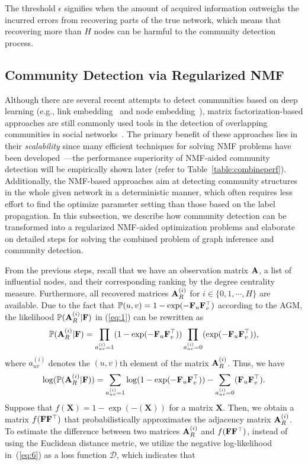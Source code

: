 \documentclass[format=acmsmall, review=false, screen=true]{acmart}
\def \log{\operatorname{log}}
\def \exp{\operatorname{exp}}
\begin{document}
The threshold $\epsilon$ signifies when the amount of acquired information outweighs the incurred errors from recovering parts of the true network, which means that recovering more than $H$ nodes can be harmful to the community detection process.

\subsection{Community Detection via Regularized NMF}\label{sec:3d}

Although there are several recent attempts to detect communities based on deep learning (e.g., link embedding~\cite{linkblack} and node embedding~\cite{vgraph}), matrix factorization-based approaches are still commonly used tools in the detection of overlapping communities in social networks~\cite{bigclam,BNMF,newnmf}. The primary benefit of these approaches lies in their {\em scalability} since many efficient techniques for solving NMF problems have been developed~\cite{nmfsolve}---the performance superiority of NMF-aided community detection will be empirically shown  later (refer to Table~\ref{table:combineperf}). Additionally, the NMF-based approaches aim at detecting community structures in the whole given network in a deterministic manner, which often requires less effort to find the optimize parameter setting than those based on the label propagation. In this subsection, we describe how community detection can be transformed into a regularized NMF-aided optimization problems and elaborate on detailed steps for solving the combined problem of graph inference and community detection.

From the previous steps, recall that we have an observation matrix ${\bf A}$, a list of influential nodes, and their corresponding ranking by the degree centrality measure. Furthermore, all recovered matrices ${\bf A}^{(i)}_R$ for $i \in \{0,1,\cdots,H\}$ are available. Due to the fact that $\mathbb{P}(u,v) = 1 - \exp(-{\bf F}_{u} {\bf F}^{\top}_{v})$ according to the AGM, the likelihood $\mathbb{P}({\bf A}_R^{(i)}|{\bf F})$ in (\ref{eq:1}) can be rewritten as
\begin{equation}\label{eq:5}
\mathbb{P}({\bf A}_R^{(i)}|{\bf F}) = \prod_{a_{uv}^{(i)} =1}(1 - \exp(-{\bf F}_u{\bf F}_v^\top)) \prod_{a_{uv}^{(i)} = 0}(\exp(-{\bf F}_u{\bf F}_v^\top)),\nonumber
\end{equation}
where $a_{uv}^{(i)}$ denotes the $(u,v)$th element of the matrix ${\bf{A}}_R^{(i)}$. Thus, we have
\begin{equation}\label{eq:6}
\log(\mathbb{P}({\bf A}_R^{(i)}|{\bf F})) = \sum_{a_{uv}^{(i)} =1}\log(1 - \exp(-{\bf F}_u{\bf F}_v^\top)) - \sum_{a_{uv}^{(i)} =0}({\bf F}_u{\bf F}_v^\top).
\end{equation}
Suppose that $f(\textbf{X}) = 1 - \exp(-(\textbf{X}))$ for a matrix $\textbf{X}$. Then, we obtain a matrix $f({\bf F}{\bf F}^\top)$ that probabilistically approximates the adjacency matrix ${\bf A}^{(i)}_R$. To estimate the difference between two matrices ${\bf A}^{(i)}_R$ and $f({\bf F}{\bf F}^\top)$, instead of using the Euclidean distance metric, we utilize the negative log-likelihood in~(\ref{eq:6}) as a loss function $\mathcal{D}$, which indicates that 
\end{document}
